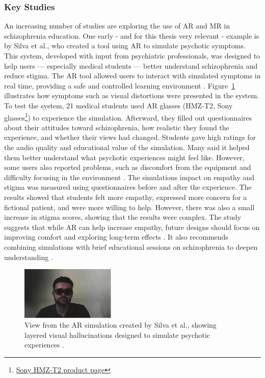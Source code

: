 \subsubsection{Key Studies}
\label{sec:keystudies}

An increasing number of studies are exploring the use of AR and MR in schizophrenia education. One early - and for this thesis very relevant - example is by Silva et al., who created a tool using AR to simulate psychotic symptoms. This system, developed with input from psychiatric professionals, was designed to help users — especially medical students — better understand schizophrenia and reduce stigma. The AR tool allowed users to interact with simulated symptoms in real time, providing a safe and controlled learning environment \cite{Silva2017}. Figure~\ref{fig:silva_ar_scene} illustrates how symptoms such as visual distortions were presented in the system. To test the system, 21 medical students used AR glasses (HMZ-T2, Sony glasses\footnote{\href{https://www.vrbrillen.net/sony-hmz-t2/}{Sony HMZ-T2 product page}}) to experience the simulation. Afterward, they filled out questionnaires about their attitudes toward schizophrenia, how realistic they found the experience, and whether their views had changed. Students gave high ratings for the audio quality and educational value of the simulation. Many said it helped them better understand what psychotic experiences might feel like. However, some users also reported problems, such as discomfort from the equipment and difficulty focusing in the environment \cite{Silva2017}. The simulations impact on empathy and stigma was measured using questionnaires before and after the experience. The results showed that students felt more empathy, expressed more concern for a fictional patient, and were more willing to help. However, there was also a small increase in stigma scores, showing that the results were complex. The study suggests that while AR can help increase empathy, future designs should focus on improving comfort and exploring long-term effects \cite{Silva2017}. It also recommends combining simulations with brief educational sessions on schizophrenia to deepen understanding \cite{Silva2017}. 


\begin{figure}[H]
  \centering
  \includegraphics[width=0.4\textwidth]{../../Figures/silva_ar_scene.png}
  \caption{View from the AR simulation created by Silva et al., showing layered visual hallucinations designed to simulate psychotic experiences \cite{Silva2017}.}
  \label{fig:silva_ar_scene}
\end{figure}


